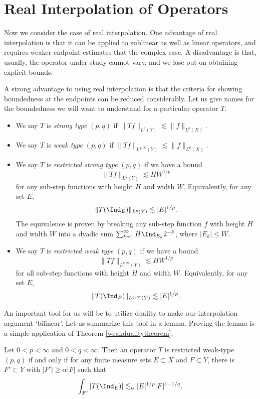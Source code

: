 \section{Real Interpolation of Operators}

Now we consider the case of real interpolation. One advantage of real interpolation is that it can be applied to sublinear as well as linear operators, and requires weaker endpoint estimates that the complex case. A disadvantage is that, usually, the operator under study cannot vary, and we lose out on obtaining explicit bounds.

A strong advantage to using real interpolation is that the criteria for showing boundedness at the endpoints can be reduced considerably. Let us give names for the boundedness we will want to understand for a particular operator $T$.
%
\begin{itemize}
  \item We say $T$ is \emph{strong type} $(p,q)$ if $\| Tf \|_{L^q(Y)} \lesssim \| f \|_{L^p(X)}$.

  \item We say $T$ is \emph{weak type} $(p,q)$ if $\| Tf \|_{L^{q,\infty}(Y)} \lesssim \| f \|_{L^p(X)}$.

  \item We say $T$ is \emph{restricted strong type} $(p,q)$ if we have a bound
  \[ \| Tf \|_{L^q(Y)} \lesssim HW^{1/p} \]
  for any sub-step functions with height $H$ and width $W$. Equivalently, for any set $E$,
  \[ \| T(\Ind_E) \|_{L^q(Y)} \lesssim |E|^{1/p}. \]
  The equivalence is proven by breaking any sub-step function $f$ with height $H$ and width $W$ into a dyadic sum $\sum_{k = 1}^\infty H \Ind_{E_k} 2^{-k}$, where $|E_k| \leq W$.

  \item We say $T$ is \emph{restricted weak type} $(p,q)$ if we have a bound
  \[ \| Tf \|_{L^{q,\infty}(Y)} \lesssim HW^{1/p} \]
  for all sub-step functions with height $H$ and width $W$. Equivalently, for any set $E$,
  \[ \| T(\Ind_E) \|_{L^{q,\infty}(Y)} \lesssim |E|^{1/p}. \]
\end{itemize}
%
An important tool for us will be to utilize duality to make our interpolation argument `bilinear'. Let us summarize this tool in a lemma. Proving the lemma is a simple application of Theorem \ref{weakdualitytheorem}.

\begin{lemma}
  Let $0 < p < \infty$ and $0 < q < \infty$. Then an operator $T$ is restricted weak-type $(p,q)$ if and only if for any finite measure sets $E \subset X$ and $F \subset Y$, there is $F' \subset Y$ with $|F'| \geq \alpha |F|$ such that
  \[ \int_{F'} |T(\Ind_E)| \lesssim_\alpha |E|^{1/p} |F|^{1-1/q}. \]
\end{lemma}

